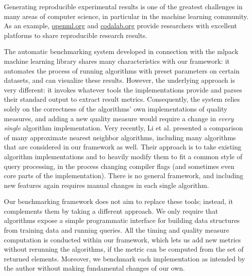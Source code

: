 \medskip

Generating reproducible experimental results is one of the greatest challenges in many areas of computer science, in particular in the machine learning community. As an example, \url{openml.org} \cite{openml2013} and \url{codalab.org} provide researchers with excellent platforms to share reproducible research results. 

The automatic benchmarking system developed in connection with the
\textsf{mlpack} machine learning library
\cite{mlpack2013,edel2014automatic} %
shares many characteristics with our framework: it automates the process of
running algorithms with preset parameters on certain datasets, and can
visualize these results. However, the underlying approach is very
different: it invokes whatever tools the implementations provide and parses
their standard output to extract result metrics. Consequently, the system
relies solely on the correctness of the algorithms' own implementations of
quality measures, and adding a new quality
measure would require a change in \emph{every single} algorithm implementation. Very recently,
Li et al. \cite{LiZSWZL16} presented a comparison of many approximate nearest neighbor algorithms, 
including many algorithms that are considered in our framework as well.  Their
approach is to take existing algorithm implementations and to heavily modify
them to fit a common style of query processing, in the process changing
compiler flags (and sometimes even core parts of the implementation). There
is no general framework, and including new features again requires manual
changes in each single algorithm.

Our benchmarking framework does not aim to replace these tools; instead, it
complements them by taking a different approach. We
only require that algorithms expose a simple programmatic interface for
building
data structures from training data and running queries. All the timing and quality measure
computation is conducted within our framework, which lets us add new metrics
without rerunning the algorithms, if the metric can be computed from the set
of returned elements. Moreover, we benchmark each implementation as intended 
by the author without making fundamental changes of our own.

\medskip

